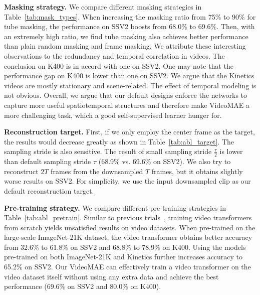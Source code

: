 \documentclass{article}
\begin{document}
\par{\noindent \textbf{Masking strategy.}}
We compare different masking strategies in Table~\ref{tab:mask_types}. When increasing the masking ratio from 75\% to 90\% for tube masking, the performance on SSV2 boosts from 68.0\% to 69.6\%. Then, with an extremely high ratio, we find tube masking also achieves better performance than plain random masking and frame masking. We attribute these interesting observations to the redundancy and temporal correlation in videos. The conclusion on K400 is in accord with one on SSV2. One may note that the performance gap on K400 is lower than one on SSV2. We argue that the Kinetics videos are mostly stationary and scene-related. The effect of temporal modeling is not obvious. Overall, we argue that our default designs enforce the networks to capture more useful spatiotemporal structures and therefore make VideoMAE a more challenging task, which a good self-supervised learner hunger for.

\par{\noindent \textbf{Reconstruction target.}}  First, if we only employ the center frame as the target, the results would decrease greatly as shown in Table~\ref{tab:abl_target}. The sampling stride is also sensitive. The result of small sampling stride $\frac{\tau}{2}$ is lower than default sampling stride $\tau$ (68.9\% vs. 69.6\% on SSV2).
We also try to reconstruct $2T$ frames from the downsampled $T$ frames, but it obtains slightly worse results on SSV2. For simplicity, we use the input downsampled clip as our default reconstruction target.

\par{\noindent \textbf{Pre-training strategy.}} We compare different pre-training strategies in Table~\ref{tab:abl_pretrain}. Similar to previous trials~\cite{vivit,timesformer}, training video transformers from scratch yields unsatisfied results on video datasets. When pre-trained on the large-scale ImageNet-21K dataset, the video transformer obtains better accuracy from 32.6\% to 61.8\% on SSV2 and 68.8\% to 78.9\% on K400. Using the models pre-trained on both ImageNet-21K and Kinetics further increases accuracy to 65.2\% on SSV2. Our VideoMAE can effectively train a video transformer on the video dataset itself without using any extra data and achieve the best performance (69.6\% on SSV2 and 80.0\% on K400). 
\end{document}
